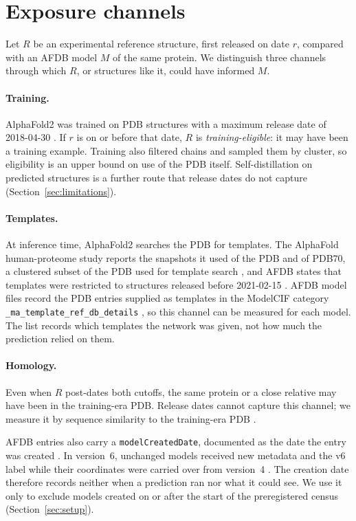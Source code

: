 \documentclass{article}
\begin{document}
\section{Exposure channels}
\label{sec:channels}

Let $R$ be an experimental reference structure, first released on date $r$,
compared with an AFDB model $M$ of the same protein. We distinguish three
channels through which $R$, or structures like it, could have informed $M$.

\paragraph{Training.} AlphaFold2 was trained on PDB structures with a
maximum release date of 2018-04-30 \citep{jumper2021}. If $r$ is on or
before that date, $R$ is \emph{training-eligible}: it may have been a
training example. Training also filtered chains and sampled them by cluster,
so eligibility is an upper bound on use of the PDB itself. Self-distillation
on predicted structures is a further route that release dates do not capture
(Section~\ref{sec:limitations}).

\paragraph{Templates.} At inference time, AlphaFold2 searches the PDB for
templates. The AlphaFold human-proteome study reports the snapshots it used
of the PDB and of PDB70, a clustered subset of the PDB used for template
search \citep{tunyasuvunakool2021}, and AFDB states that templates were
restricted to structures released before 2021-02-15 \citep{afdbfaq}. AFDB
model files record the PDB entries supplied as templates in the ModelCIF
category \texttt{\_ma\_\allowbreak template\_\allowbreak ref\_\allowbreak db\_\allowbreak details}
\citep{afdbfaq,vallat2023modelcif}, so this channel can be measured for each
model. The list records which templates the network was given, not how much
the prediction relied on them.

\paragraph{Homology.} Even when $R$ post-dates both cutoffs, the same
protein or a close relative may have been in the training-era PDB. Release
dates cannot capture this channel; we measure it by sequence similarity to
the training-era PDB \citep{jumper2021,buttenschoen2024}.

AFDB entries also carry a \texttt{modelCreatedDate}, documented as the date
the entry was created \citep{afdbmetadata}. In version~6, unchanged models
received new metadata and the v6 label while their coordinates were carried
over from version~4 \citep{pdbereleasenotes}. The creation date therefore
records neither when a prediction ran nor what it could see. We use it only
to exclude models created on or after the start of the preregistered census
(Section~\ref{sec:setup}).
\end{document}
